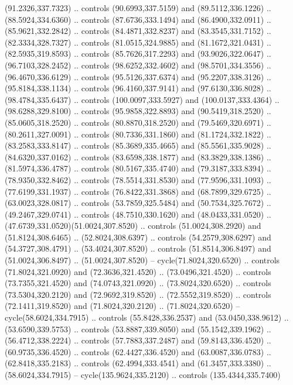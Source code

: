 \begin{scope}[cm={{1.25,0.0,0.0,-1.25,(0.0,743.43331)}}]
    (91.2326,337.7323) .. controls (90.6993,337.5159) and (89.5112,336.1226) ..
    (88.5924,334.6360) .. controls (87.6736,333.1494) and (86.4900,332.0911) ..
    (85.9621,332.2842) .. controls (84.4871,332.8237) and (83.3545,331.7152) ..
    (82.3334,328.7327) .. controls (81.0515,324.9885) and (81.1672,321.0431) ..
    (82.5935,319.8593) .. controls (85.7626,317.2293) and (93.9026,322.0647) ..
    (96.7103,328.2452) .. controls (98.6252,332.4602) and (98.5701,334.3556) ..
    (96.4670,336.6129) .. controls (95.5126,337.6374) and (95.2207,338.3126) ..
    (95.8184,338.1134) .. controls (96.4160,337.9141) and (97.6130,336.8028) ..
    (98.4784,335.6437) .. controls (100.0097,333.5927) and (100.0137,333.4364) ..
    (98.6288,329.8100) .. controls (95.9858,322.8893) and (90.5419,318.2520) ..
    (85.0605,318.2520) .. controls (80.8870,318.2520) and (79.5469,320.6971) ..
    (80.2611,327.0091) .. controls (80.7336,331.1860) and (81.1724,332.1822) ..
    (83.2583,333.8147) .. controls (85.3689,335.4665) and (85.5561,335.9028) ..
    (84.6320,337.0162) .. controls (83.6598,338.1877) and (83.3829,338.1386) ..
    (81.5974,336.4787) .. controls (80.5167,335.4740) and (79.3187,333.8394) ..
    (78.9350,332.8462) .. controls (78.5514,331.8530) and (77.9596,331.1093) ..
    (77.6199,331.1937) .. controls (76.8422,331.3868) and (68.7899,329.6725) ..
    (63.0023,328.0817) .. controls (53.7859,325.5484) and (50.7534,325.7672) ..
    (49.2467,329.0741) .. controls (48.7510,330.1620) and (48.0433,331.0520) ..
    (47.6739,331.0520)(51.0024,307.8520) .. controls (51.0024,308.2920) and
    (51.8124,308.6465) .. (52.8024,308.6397) .. controls (54.2579,308.6297) and
    (54.3727,308.4791) .. (53.4024,307.8520) .. controls (51.8514,306.8497) and
    (51.0024,306.8497) .. (51.0024,307.8520) -- cycle(71.8024,320.6520) ..
    controls (71.8024,321.0920) and (72.3636,321.4520) .. (73.0496,321.4520) ..
    controls (73.7355,321.4520) and (74.0743,321.0920) .. (73.8024,320.6520) ..
    controls (73.5304,320.2120) and (72.9692,319.8520) .. (72.5552,319.8520) ..
    controls (72.1411,319.8520) and (71.8024,320.2120) .. (71.8024,320.6520) --
    cycle(58.6024,334.7915) .. controls (55.8428,336.2537) and (53.0450,338.9612)
    .. (53.6590,339.5753) .. controls (53.8887,339.8050) and (55.1542,339.1962) ..
    (56.4712,338.2224) .. controls (57.7883,337.2487) and (59.8143,336.4520) ..
    (60.9735,336.4520) .. controls (62.4427,336.4520) and (63.0087,336.0783) ..
    (62.8418,335.2183) .. controls (62.4994,333.4541) and (61.3457,333.3380) ..
    (58.6024,334.7915) -- cycle(135.9624,335.2120) .. controls (135.4344,335.7400)

\end{scope}
